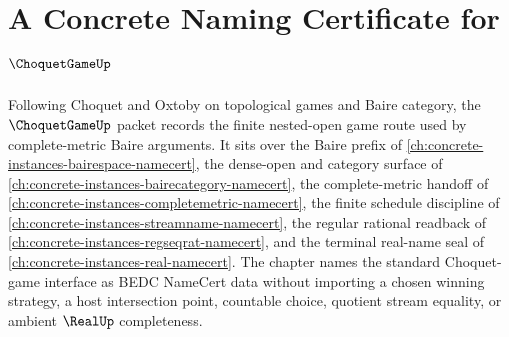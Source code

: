 \chapter{A Concrete Naming Certificate for $\ChoquetGameUp$}
\label{ch:concrete-instances-choquet-game-namecert}

Following Choquet and Oxtoby on topological games and Baire category, the $\ChoquetGameUp$ packet records the finite nested-open game route used by complete-metric Baire arguments. It sits over the Baire prefix of \autoref{ch:concrete-instances-bairespace-namecert}, the dense-open and category surface of \autoref{ch:concrete-instances-bairecategory-namecert}, the complete-metric handoff of \autoref{ch:concrete-instances-completemetric-namecert}, the finite schedule discipline of \autoref{ch:concrete-instances-streamname-namecert}, the regular rational readback of \autoref{ch:concrete-instances-regseqrat-namecert}, and the terminal real-name seal of \autoref{ch:concrete-instances-real-namecert}. The chapter names the standard Choquet-game interface as BEDC NameCert data without importing a chosen winning strategy, a host intersection point, countable choice, quotient stream equality, or ambient $\RealUp$ completeness.


